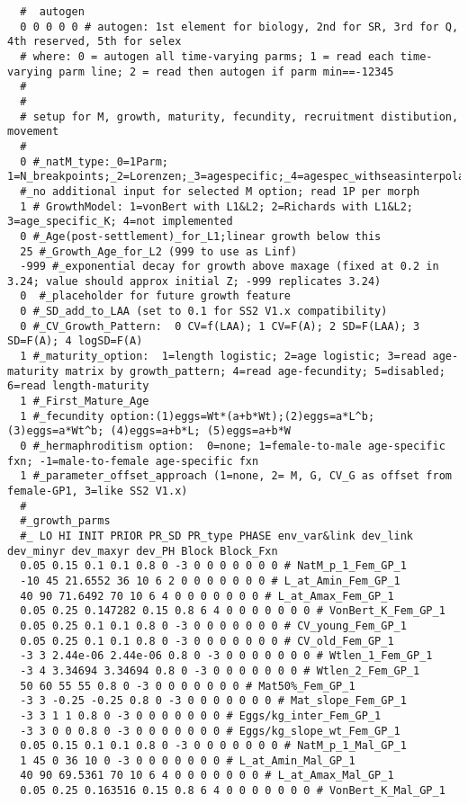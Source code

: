 \begin{landscape}
{\begin{verbatim}
  #  autogen
  0 0 0 0 0 # autogen: 1st element for biology, 2nd for SR, 3rd for Q, 4th reserved, 5th for selex
  # where: 0 = autogen all time-varying parms; 1 = read each time-varying parm line; 2 = read then autogen if parm min==-12345
  # 
  #
  # setup for M, growth, maturity, fecundity, recruitment distibution, movement 
  #
  0 #_natM_type:_0=1Parm; 1=N_breakpoints;_2=Lorenzen;_3=agespecific;_4=agespec_withseasinterpolate
  #_no additional input for selected M option; read 1P per morph
  1 # GrowthModel: 1=vonBert with L1&L2; 2=Richards with L1&L2; 3=age_specific_K; 4=not implemented
  0 #_Age(post-settlement)_for_L1;linear growth below this
  25 #_Growth_Age_for_L2 (999 to use as Linf)
  -999 #_exponential decay for growth above maxage (fixed at 0.2 in 3.24; value should approx initial Z; -999 replicates 3.24)
  0  #_placeholder for future growth feature
  0 #_SD_add_to_LAA (set to 0.1 for SS2 V1.x compatibility)
  0 #_CV_Growth_Pattern:  0 CV=f(LAA); 1 CV=F(A); 2 SD=F(LAA); 3 SD=F(A); 4 logSD=F(A)
  1 #_maturity_option:  1=length logistic; 2=age logistic; 3=read age-maturity matrix by growth_pattern; 4=read age-fecundity; 5=disabled; 6=read length-maturity
  1 #_First_Mature_Age
  1 #_fecundity option:(1)eggs=Wt*(a+b*Wt);(2)eggs=a*L^b;(3)eggs=a*Wt^b; (4)eggs=a+b*L; (5)eggs=a+b*W
  0 #_hermaphroditism option:  0=none; 1=female-to-male age-specific fxn; -1=male-to-female age-specific fxn
  1 #_parameter_offset_approach (1=none, 2= M, G, CV_G as offset from female-GP1, 3=like SS2 V1.x)
  #
  #_growth_parms
  #_ LO HI INIT PRIOR PR_SD PR_type PHASE env_var&link dev_link dev_minyr dev_maxyr dev_PH Block Block_Fxn
  0.05 0.15 0.1 0.1 0.8 0 -3 0 0 0 0 0 0 0 # NatM_p_1_Fem_GP_1
  -10 45 21.6552 36 10 6 2 0 0 0 0 0 0 0 # L_at_Amin_Fem_GP_1
  40 90 71.6492 70 10 6 4 0 0 0 0 0 0 0 # L_at_Amax_Fem_GP_1
  0.05 0.25 0.147282 0.15 0.8 6 4 0 0 0 0 0 0 0 # VonBert_K_Fem_GP_1
  0.05 0.25 0.1 0.1 0.8 0 -3 0 0 0 0 0 0 0 # CV_young_Fem_GP_1
  0.05 0.25 0.1 0.1 0.8 0 -3 0 0 0 0 0 0 0 # CV_old_Fem_GP_1
  -3 3 2.44e-06 2.44e-06 0.8 0 -3 0 0 0 0 0 0 0 # Wtlen_1_Fem_GP_1
  -3 4 3.34694 3.34694 0.8 0 -3 0 0 0 0 0 0 0 # Wtlen_2_Fem_GP_1
  50 60 55 55 0.8 0 -3 0 0 0 0 0 0 0 # Mat50%_Fem_GP_1
  -3 3 -0.25 -0.25 0.8 0 -3 0 0 0 0 0 0 0 # Mat_slope_Fem_GP_1
  -3 3 1 1 0.8 0 -3 0 0 0 0 0 0 0 # Eggs/kg_inter_Fem_GP_1
  -3 3 0 0 0.8 0 -3 0 0 0 0 0 0 0 # Eggs/kg_slope_wt_Fem_GP_1
  0.05 0.15 0.1 0.1 0.8 0 -3 0 0 0 0 0 0 0 # NatM_p_1_Mal_GP_1
  1 45 0 36 10 0 -3 0 0 0 0 0 0 0 # L_at_Amin_Mal_GP_1
  40 90 69.5361 70 10 6 4 0 0 0 0 0 0 0 # L_at_Amax_Mal_GP_1
  0.05 0.25 0.163516 0.15 0.8 6 4 0 0 0 0 0 0 0 # VonBert_K_Mal_GP_1

\end{verbatim}}
\end{landscape}

